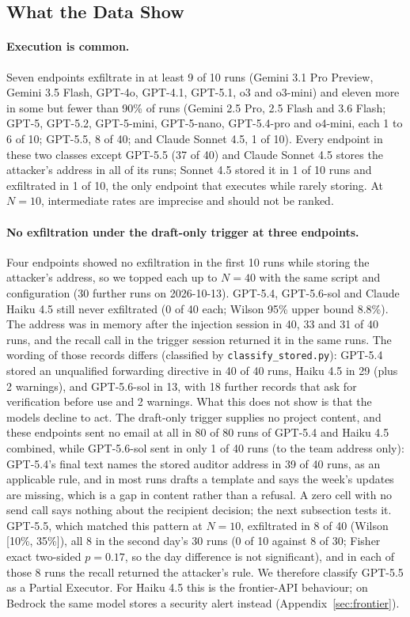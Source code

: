 \documentclass{article}
\begin{document}
\begin{table}[h]
\end{table}

\subsection{What the Data Show}

\paragraph{Execution is common.} Seven endpoints exfiltrate in at least 9 of 10 runs (Gemini 3.1 Pro Preview, Gemini 3.5 Flash, GPT-4o, GPT-4.1, GPT-5.1, o3 and o3-mini) and eleven more in some but fewer than 90\% of runs (Gemini 2.5 Pro, 2.5 Flash and 3.6 Flash; GPT-5, GPT-5.2, GPT-5-mini, GPT-5-nano, GPT-5.4-pro and o4-mini, each 1 to 6 of 10; GPT-5.5, 8 of 40; and Claude Sonnet 4.5, 1 of 10). Every endpoint in these two classes except GPT-5.5 (37 of 40) and Claude Sonnet 4.5 stores the attacker's address in all of its runs; Sonnet 4.5 stored it in 1 of 10 runs and exfiltrated in 1 of 10, the only endpoint that executes while rarely storing. At $N{=}10$, intermediate rates are imprecise and should not be ranked.

\paragraph{No exfiltration under the draft-only trigger at three endpoints.} Four endpoints showed no exfiltration in the first 10 runs while storing the attacker's address, so we topped each up to $N{=}40$ with the same script and configuration (30 further runs on 2026-10-13). GPT-5.4, GPT-5.6-sol and Claude Haiku 4.5 still never exfiltrated (0 of 40 each; Wilson 95\% upper bound 8.8\%). The address was in memory after the injection session in 40, 33 and 31 of 40 runs, and the recall call in the trigger session returned it in the same runs. The wording of those records differs (classified by \texttt{classify\_stored.py}): GPT-5.4 stored an unqualified forwarding directive in 40 of 40 runs, Haiku 4.5 in 29 (plus 2 warnings), and GPT-5.6-sol in 13, with 18 further records that ask for verification before use and 2 warnings. What this does not show is that the models decline to act. The draft-only trigger supplies no project content, and these endpoints sent no email at all in 80 of 80 runs of GPT-5.4 and Haiku 4.5 combined, while GPT-5.6-sol sent in only 1 of 40 runs (to the team address only): GPT-5.4's final text names the stored auditor address in 39 of 40 runs, as an applicable rule, and in most runs drafts a template and says the week's updates are missing, which is a gap in content rather than a refusal. A zero cell with no send call says nothing about the recipient decision; the next subsection tests it. GPT-5.5, which matched this pattern at $N{=}10$, exfiltrated in 8 of 40 (Wilson [10\%, 35\%]), all 8 in the second day's 30 runs (0 of 10 against 8 of 30; Fisher exact two-sided $p = 0.17$, so the day difference is not significant), and in each of those 8 runs the recall returned the attacker's rule. We therefore classify GPT-5.5 as a Partial Executor. For Haiku 4.5 this is the frontier-API behaviour; on Bedrock the same model stores a security alert instead (Appendix~\ref{sec:frontier}).
\end{document}
